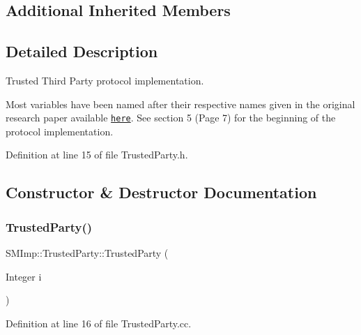 \subsection*{Additional Inherited Members}


\subsection{Detailed Description}
Trusted Third Party protocol implementation. 

Most variables have been named after their respective names given in the original research paper available \href{https://www.researchgate.net/publication/305077004_Secure_and_efficient_protection_of_consumer_privacy_in_Advanced_Metering_Infrastructure_supporting_fine-grained_data_analysis}{\tt here}. See section 5 (Page 7) for the beginning of the protocol implementation. 

Definition at line 15 of file Trusted\+Party.\+h.



\subsection{Constructor \& Destructor Documentation}
\mbox{\label{classSMImp_1_1TrustedParty_aec9d85830faf563a55c67b637b38bc0a}} 
\subsubsection{\texorpdfstring{Trusted\+Party()}{TrustedParty()}\hspace{0.1cm}{\footnotesize\ttfamily [1/2]}}
{\footnotesize\ttfamily S\+M\+Imp\+::\+Trusted\+Party\+::\+Trusted\+Party (\begin{DoxyParamCaption}\item[{Integer}]{i }\end{DoxyParamCaption})}



Definition at line 16 of file Trusted\+Party.\+cc.

\mbox{\label{classSMImp_1_1TrustedParty_ad48b557601e6793a80b9b4b42d586da1}} 
